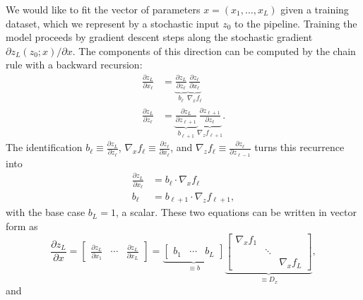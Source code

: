 \documentclass{article}
\begin{document}
We would like to fit the vector of parameters $x = (x_1, \ldots, x_L)$ given a training dataset, which we represent by
a stochastic input $z_0$ to the pipeline. Training the model proceeds by gradient descent steps along the stochastic
gradient $\partial z_L(z_0;x) / \partial x$. The components of this direction can be computed by the chain rule with a
backward recursion:
\begin{align}
    \label{eq:backprop}
    \frac{\partial z_L}{\partial x_\ell} & = \underbrace{\frac{\partial z_L}{\partial z_{\ell}}}_{b_\ell} \underbrace{\frac{\partial z_\ell}{\partial x_\ell}}_{\nabla_x f_\ell}                \\
    \frac{\partial z_L}{\partial z_\ell} & = \underbrace{\frac{\partial z_L}{\partial z_{\ell+1}}}_{b_{\ell+1}} \underbrace{\frac{\partial z_{\ell+1}}{\partial z_\ell}}_{\nabla_z f_{\ell+1}}.
\end{align}
The identification $b_\ell \equiv \frac{\partial z_L}{\partial z_\ell}$, $\nabla_x f_\ell \equiv \frac{\partial z_\ell}{\partial x_\ell}$, and $\nabla_z f_\ell \equiv \frac{\partial z_\ell}{\partial z_{\ell-1}}$ turns this recurrence into
\begin{align}
    \frac{\partial z_L}{\partial x_\ell} & = b_\ell \cdot \nabla_x f_\ell          \\
    b_\ell                               & = b_{\ell+1} \cdot \nabla_z f_{\ell+1},
\end{align}
with the base case $b_L = 1$, a scalar.  These two equations can be written in vector form as
\begin{equation}
    \frac{\partial z_L}{\partial x} =
    \begin{bmatrix}
        \frac{\partial z_L}{\partial x_1} & \cdots & \frac{\partial z_L}{\partial x_L}
    \end{bmatrix}
    =
    \underbrace{\begin{bmatrix}
            b_1 & \cdots & b_L
        \end{bmatrix}
    }_{\equiv b}
    \underbrace{\begin{bmatrix}
            \nabla_x f_1 &                       \\
                         & \ddots                \\
                         &        & \nabla_x f_L
        \end{bmatrix}
    }_{\equiv D_x},
\end{equation}
and
\end{document}
